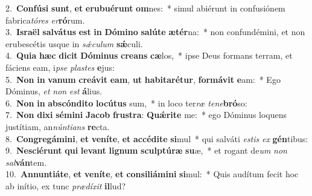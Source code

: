 {2.~}\textbf{Con}\textbf{fú}\textbf{si} \textbf{sunt}, \textbf{et} \textbf{e}\textbf{ru}\textbf{bu}\textbf{é}\textbf{runt} \textbf{om}nes:~* simul abiérunt in confusiónem fabrica\textit{tó}\textit{res} \textit{er}\textbf{ró}rum.\\
{3.~}\textbf{Is}\textbf{ra}\textbf{ël} \textbf{sal}\textbf{vá}\textbf{tus} \textbf{est} \textbf{in} \textbf{Dó}\textbf{mi}\textbf{no} \textbf{sa}\textbf{lú}\textbf{te} \textbf{æ}\textbf{tér}na:~* non confundémini, et non erubescétis usque in \textit{sǽ}\textit{cu}\textit{lum} \textbf{sǽ}culi.\\
{4.~}\textbf{Qui}\textbf{a} \textbf{hæc} \textbf{di}\textbf{cit} \textbf{Dó}\textbf{mi}\textbf{nus} \textbf{cre}\textbf{ans} \textbf{cæ}los,~* ipse Deus formans terram, et fáciens eam, i\textit{pse} \textit{pla}\textit{stes} \textbf{e}jus:\\
{5.~}\textbf{Non} \textbf{in} \textbf{va}\textbf{num} \textbf{cre}\textbf{á}\textbf{vit} \textbf{e}\textbf{am}, \textbf{ut} \textbf{ha}\textbf{bi}\textbf{ta}\textbf{ré}\textbf{tur}, \textbf{for}\textbf{má}\textbf{vit} \textbf{e}am:~* Ego Dóminus, \textit{et} \textit{non} \textit{est} \textbf{á}lius.\\
{6.~}\textbf{Non} \textbf{in} \textbf{ab}\textbf{scón}\textbf{di}\textbf{to} \textbf{lo}\textbf{cú}\textbf{tus} sum,~* in loco ter\textit{ræ} \textit{te}\textit{ne}\textbf{bró}so:\\
{7.~}\textbf{Non} \textbf{di}\textbf{xi} \textbf{sé}\textbf{mi}\textbf{ni} \textbf{Ja}\textbf{cob} \textbf{fru}\textbf{stra}: \textbf{Quǽ}\textbf{ri}\textbf{te} me:~* ego Dóminus loquens justítiam, an\textit{nún}\textit{ti}\textit{ans} \textbf{re}cta.\\
{8.~}\textbf{Con}\textbf{gre}\textbf{gá}\textbf{mi}\textbf{ni}, \textbf{et} \textbf{ve}\textbf{ní}\textbf{te}, \textbf{et} \textbf{ac}\textbf{cé}\textbf{di}\textbf{te} \textbf{si}mul~* qui salváti \textit{e}\textit{stis} \textit{ex} \textbf{gén}tibus:\\
{9.~}\textbf{Ne}\textbf{sci}\textbf{é}\textbf{runt} \textbf{qui} \textbf{le}\textbf{vant} \textbf{li}\textbf{gnum} \textbf{scul}\textbf{ptú}\textbf{ræ} \textbf{su}æ,~* et rogant de\textit{um} \textit{non} \textit{sal}\textbf{ván}tem.\\
{10.~}\textbf{An}\textbf{nun}\textbf{ti}\textbf{á}\textbf{te}, \textbf{et} \textbf{ve}\textbf{ní}\textbf{te}, \textbf{et} \textbf{con}\textbf{si}\textbf{li}\textbf{á}\textbf{mi}\textbf{ni} \textbf{si}mul:~* Quis audítum fecit hoc ab inítio, ex tunc \textit{præ}\textit{dí}\textit{xit} \textbf{il}lud?\\
